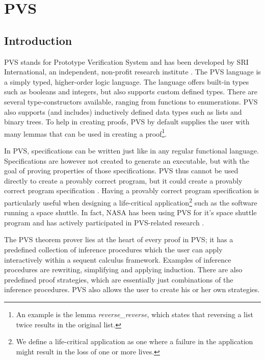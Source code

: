 \section{PVS}

\subsection{Introduction}
PVS stands for Prototype Verification System and has been developed by SRI International, an independent, non-profit research institute \cite{sri06nonprofit}. The PVS language is a simply typed, higher-order logic language. The language offers built-in types such as booleans and integers, but also supports custom defined types. There are several type-constructors available, ranging from functions to enumerations. PVS also supports (and includes) inductively defined data types such as lists and binary trees. To help in creating proofs, PVS by default supplies the user with many lemmas that can be used in creating a proof\footnote{An example is the lemma \emph{reverse\_reverse}, which states that reversing a list twice results in the original list.}.\emptyline

In PVS, specifications can be written just like in any regular functional language. Specifications are however not created to generate an executable, but with the goal of proving properties of those specifications. PVS thus cannot be used directly to create a provably correct program, but it could create a provably correct program specification \cite{miller95formal}. Having a provably correct program specification is particularly useful when designing a life-critical application\footnote{We define a life-critical application as one where a failure in the application might result in the loss of one or more lives.} such as the software running a space shuttle. In fact, NASA has been using PVS for it's space shuttle program \cite{crow98formalizing} and has actively participated in PVS-related research \cite{vito03application}.\emptyline

The PVS theorem prover lies at the heart of every proof in PVS; it has a predefined collection of inference procedures which the user can apply interactively within a sequent calculus framework. Examples of inference procedures are rewriting, simplifying and applying induction. There are also predefined proof strategies, which are essentially just combinations of the inference procedures. PVS also allows the user to create his or her own strategies.\emptyline

